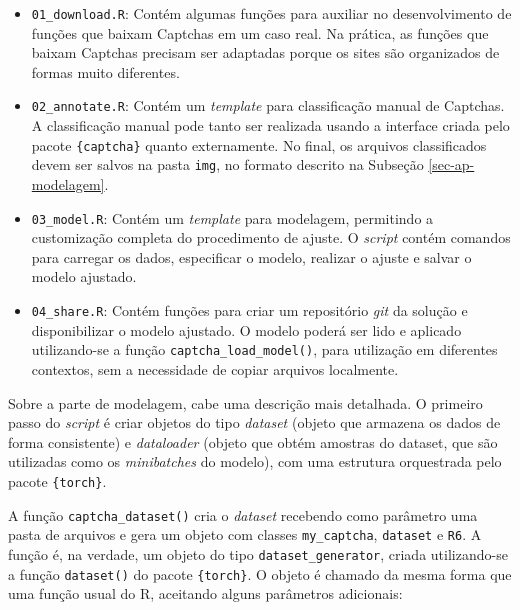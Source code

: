 \documentclass[12pt,twoside,brazilian]{book}
\providecommand{\tightlist}{%
  \setlength{\itemsep}{0pt}\setlength{\parskip}{0pt}}
\begin{document}
\begin{itemize}
\tightlist
\item
  \texttt{01\_download.R}: Contém algumas funções para auxiliar no
  desenvolvimento de funções que baixam Captchas em um caso real. Na
  prática, as funções que baixam Captchas precisam ser adaptadas porque
  os sites são organizados de formas muito diferentes.
\item
  \texttt{02\_annotate.R}: Contém um \emph{template} para classificação
  manual de Captchas. A classificação manual pode tanto ser realizada
  usando a interface criada pelo pacote \texttt{\{captcha\}} quanto
  externamente. No final, os arquivos classificados devem ser salvos na
  pasta \texttt{img}, no formato descrito na Subseção
  \ref{sec-ap-modelagem}.
\item
  \texttt{03\_model.R}: Contém um \emph{template} para modelagem,
  permitindo a customização completa do procedimento de ajuste. O
  \emph{script} contém comandos para carregar os dados, especificar o
  modelo, realizar o ajuste e salvar o modelo ajustado.
\item
  \texttt{04\_share.R}: Contém funções para criar um repositório
  \emph{git} da solução e disponibilizar o modelo ajustado. O modelo
  poderá ser lido e aplicado utilizando-se a função
  \texttt{captcha\_load\_model()}, para utilização em diferentes
  contextos, sem a necessidade de copiar arquivos localmente.
\end{itemize}

Sobre a parte de modelagem, cabe uma descrição mais detalhada. O
primeiro passo do \emph{script} é criar objetos do tipo \emph{dataset}
(objeto que armazena os dados de forma consistente) e \emph{dataloader}
(objeto que obtém amostras do dataset, que são utilizadas como os
\emph{minibatches} do modelo), com uma estrutura orquestrada pelo pacote
\texttt{\{torch\}}.

A função \texttt{captcha\_dataset()} cria o \emph{dataset} recebendo
como parâmetro uma pasta de arquivos e gera um objeto com classes
\texttt{my\_captcha}, \texttt{dataset} e \texttt{R6}. A função é, na
verdade, um objeto do tipo \texttt{dataset\_generator}, criada
utilizando-se a função \texttt{dataset()} do pacote \texttt{\{torch\}}.
O objeto é chamado da mesma forma que uma função usual do R, aceitando
alguns parâmetros adicionais:
\end{document}
